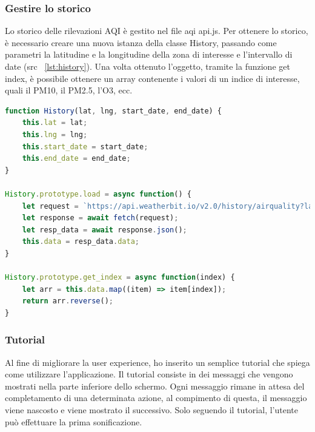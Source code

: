 \subsubsection{Gestire lo storico}
Lo storico delle rilevazioni AQI è gestito nel file aqi api.js.
Per ottenere lo storico, è necessario creare una nuova istanza della classe History, passando come parametri la latitudine e la longitudine della zona di interesse e l'intervallo di date (src ~\ref{lst:history}).
Una volta ottenuto l'oggetto, tramite la funzione get index, è possibile ottenere un array contenente i valori di un indice di interesse, quali il PM10, il PM2.5, l'O3, ecc.
\label{lst:history}
\begin{lstlisting}[language=Javascript]
function History(lat, lng, start_date, end_date) {
    this.lat = lat;
    this.lng = lng;
    this.start_date = start_date;
    this.end_date = end_date;
}

History.prototype.load = async function() {
    let request = `https://api.weatherbit.io/v2.0/history/airquality?lat=${this.lat}&lon=${this.lng}&start_date=${this.start_date}&end_date=${this.end_date}&tz=local&key=${weatherbit_key}`;
    let response = await fetch(request);
    let resp_data = await response.json();
    this.data = resp_data.data;
}

History.prototype.get_index = async function(index) {
    let arr = this.data.map((item) => item[index]);
    return arr.reverse();
}
\end{lstlisting}

\subsubsection{Tutorial}
Al fine di migliorare la user experience, ho inserito un semplice tutorial che spiega come utilizzare l'applicazione.
Il tutorial consiste in dei messaggi che vengono mostrati nella parte inferiore dello schermo.
Ogni messaggio rimane in attesa del completamento di una determinata azione, al compimento di questa, il messaggio viene nascosto e viene mostrato il successivo.
Solo seguendo il tutorial, l'utente può effettuare la prima sonificazione.



